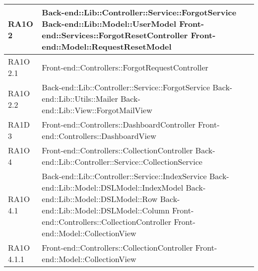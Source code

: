 \begin{center}
\begin{longtable}{ | p{3cm} | p{11cm} | }
        				     
    RA1O 2 & Back-end::Lib::Controller::Service::ForgotService \newline
    			Back-end::Lib::Model::UserModel \newline
    			Front-end::Services::ForgotResetController \newline
    			Front-end::Model::RequestResetModel  \newline  \\ \hline   
    			   
    RA1O 2.1 & Front-end::Controllers::ForgotRequestController \newline  \\ \hline   
       
    RA1O 2.2 & Back-end::Lib::Controller::Service::ForgotService \newline
    			  			Back-end::Lib::Utils::Mailer \newline
    			  			Back-end::Lib::View::ForgotMailView \newline  \\ \hline     
    			   
     
    RA1D 3 & Front-end::Controllers::DashboardController \newline Front-end::Controllers::DashboardView \\ \hline  
        
    RA1O 4 & Front-end::Controllers::CollectionController \newline 
    			Back-end::Lib::Controller::Service::CollectionService  \newline \\ \hline   
       
    RA1O 4.1 & Back-end::Lib::Controller::Service::IndexService \newline
    			Back-end::Lib::Model::DSLModel::IndexModel \newline 
    			Back-end::Lib::Model::DSLModel::Row \newline
    			Back-end::Lib::Model::DSLModel::Column \newline
    			Front-end::Controllers::CollectionController \newline 
    			Front-end::Model::CollectionView \newline  \\ \hline   
       
    RA1O 4.1.1 & Front-end::Controllers::CollectionController \newline 
    Front-end::Model::CollectionView \newline  \\ \hline 
	

\end{longtable}
\end{center}

